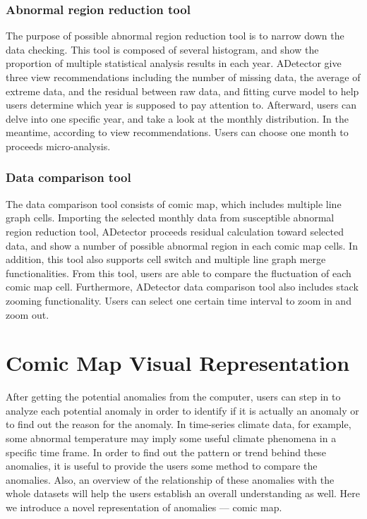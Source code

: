 \documentclass{vgtc}                          %
\begin{document}
\subsubsection{Abnormal region reduction tool}

The purpose of possible abnormal region reduction tool is to narrow down the data checking. This tool is composed of several histogram, and show the proportion of multiple statistical analysis results in each year. ADetector give three view recommendations including the number of missing data, the average of extreme data, and the residual between raw data, and fitting curve model to help users determine which year is supposed to pay attention to. Afterward, users can delve into one specific year, and take a look at the monthly distribution. In the meantime, according to view recommendations. Users can choose one month to proceeds micro-analysis.

\subsubsection{Data comparison tool}

The data comparison tool consists of comic map, which includes multiple line graph cells. Importing the selected monthly data from susceptible abnormal region reduction tool, ADetector proceeds residual calculation toward selected data, and show a number of possible abnormal region in each comic map cells. In addition, this tool also supports cell switch and multiple line graph merge functionalities. From this tool, users are able to compare the fluctuation of each comic map cell. Furthermore, ADetector data comparison tool also includes stack zooming functionality. Users can select one certain time interval to zoom in and zoom out. 

\section{Comic Map Visual Representation}

After getting the potential anomalies from the computer, users can step in to analyze each potential anomaly in order to identify if it is actually an anomaly or to find out the reason for the anomaly. In time-series climate data, for example, some abnormal temperature may imply some useful climate phenomena in a specific time frame. In order to find out the pattern or trend behind these anomalies, it is useful to provide the users some method to compare the anomalies. Also, an overview of the relationship of these anomalies with the whole datasets will help the users establish an overall understanding as well. Here we introduce a novel representation of anomalies --– comic map. 
\end{document}
